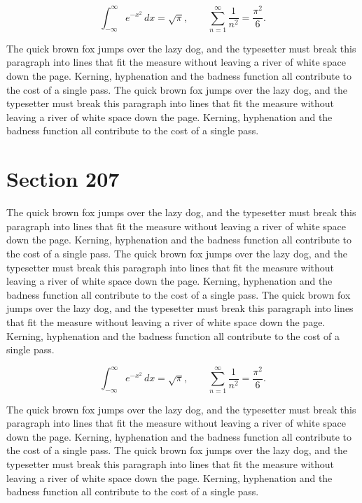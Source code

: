 \documentclass{article}
\begin{document}
\begin{equation}
\int_{-\infty}^{\infty} e^{-x^{2}}\,dx = \sqrt{\pi}, \qquad
\sum_{n=1}^{\infty} \frac{1}{n^{2}} = \frac{\pi^{2}}{6}.
\end{equation}

The quick brown fox jumps over the lazy dog, and the typesetter must break this paragraph into lines that fit the measure without leaving a river of white space down the page. Kerning, hyphenation and the badness function all contribute to the cost of a single pass. The quick brown fox jumps over the lazy dog, and the typesetter must break this paragraph into lines that fit the measure without leaving a river of white space down the page. Kerning, hyphenation and the badness function all contribute to the cost of a single pass. 
\section{Section 207}
The quick brown fox jumps over the lazy dog, and the typesetter must break this paragraph into lines that fit the measure without leaving a river of white space down the page. Kerning, hyphenation and the badness function all contribute to the cost of a single pass. The quick brown fox jumps over the lazy dog, and the typesetter must break this paragraph into lines that fit the measure without leaving a river of white space down the page. Kerning, hyphenation and the badness function all contribute to the cost of a single pass. The quick brown fox jumps over the lazy dog, and the typesetter must break this paragraph into lines that fit the measure without leaving a river of white space down the page. Kerning, hyphenation and the badness function all contribute to the cost of a single pass. 

\begin{equation}
\int_{-\infty}^{\infty} e^{-x^{2}}\,dx = \sqrt{\pi}, \qquad
\sum_{n=1}^{\infty} \frac{1}{n^{2}} = \frac{\pi^{2}}{6}.
\end{equation}

The quick brown fox jumps over the lazy dog, and the typesetter must break this paragraph into lines that fit the measure without leaving a river of white space down the page. Kerning, hyphenation and the badness function all contribute to the cost of a single pass. The quick brown fox jumps over the lazy dog, and the typesetter must break this paragraph into lines that fit the measure without leaving a river of white space down the page. Kerning, hyphenation and the badness function all contribute to the cost of a single pass. 
\end{document}
